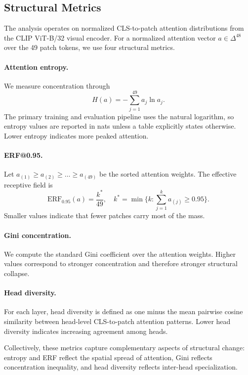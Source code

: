 \documentclass[10pt]{article}
\begin{document}
\subsection{Structural Metrics}
The analysis operates on normalized CLS-to-patch attention distributions from the CLIP ViT-B/32 visual encoder. For a normalized attention vector $a \in \Delta^{48}$ over the 49 patch tokens, we use four structural metrics.

\paragraph{Attention entropy.}
We measure concentration through
\begin{equation}
H(a) = -\sum_{j=1}^{49} a_j \ln a_j.
\end{equation}
The primary training and evaluation pipeline uses the natural logarithm, so entropy values are reported in nats unless a table explicitly states otherwise. Lower entropy indicates more peaked attention.

\paragraph{ERF@0.95.}
Let $a_{(1)} \geq a_{(2)} \geq \dots \geq a_{(49)}$ be the sorted attention weights. The effective receptive field is
\begin{equation}
\mathrm{ERF}_{0.95}(a) = \frac{k^*}{49}, \quad k^* = \min\Big\{k : \sum_{j=1}^{k} a_{(j)} \geq 0.95\Big\}.
\end{equation}
Smaller values indicate that fewer patches carry most of the mass.

\paragraph{Gini concentration.}
We compute the standard Gini coefficient over the attention weights. Higher values correspond to stronger concentration and therefore stronger structural collapse.

\paragraph{Head diversity.}
For each layer, head diversity is defined as one minus the mean pairwise cosine similarity between head-level CLS-to-patch attention patterns. Lower head diversity indicates increasing agreement among heads.

Collectively, these metrics capture complementary aspects of structural change: entropy and ERF reflect the spatial spread of attention, Gini reflects concentration inequality, and head diversity reflects inter-head specialization.
\end{document}
